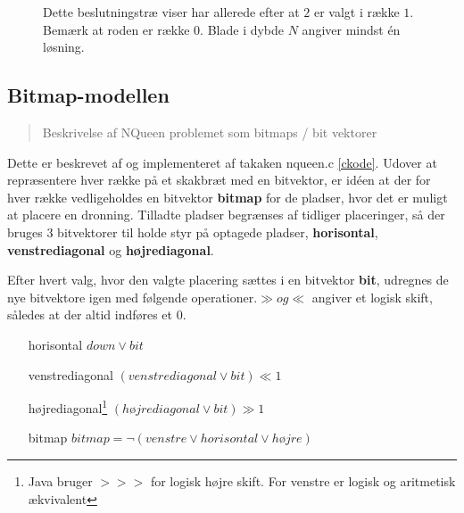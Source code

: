 \documentclass[draft,a4paper,10pt]{article}
\begin{document}
\begin{figure}[!h]


\caption{
Dette beslutningstræ viser har allerede efter at $2$ er valgt i række $1$.
Bemærk at roden er række 0. Blade i dybde $N$ angiver mindst én løsning.}
\label{fig:tree}
\end{figure}


\subsection{Bitmap-modellen}\label{bitmapmodellen}
\begin{verse}
	Beskrivelse af NQueen problemet som bitmaps / bit vektorer
\end{verse}


Dette er beskrevet af \cite{Zongyan02} og implementeret af takaken nqueen.c \ref{ckode}. Udover at repræsentere hver række på et skakbræt med en bitvektor, er idéen at der for hver række vedligeholdes en bitvektor \textbf{bitmap} for de pladser, hvor det er muligt at placere en dronning.  Tilladte pladser begrænses af tidliger placeringer, så der bruges 3 bitvektorer til holde styr på optagede pladser, \textbf{horisontal}, \textbf{venstrediagonal}  og \textbf{højrediagonal}.

Efter hvert valg, hvor den valgte placering sættes i en bitvektor \textbf{bit}, udregnes de nye bitvektore igen med følgende operationer.$\gg og \ll$ angiver et logisk skift, således at der altid indføres et $0$.
\begin{itemize}
	\item[horisontal] $down \lor bit$ 
	\item[venstrediagonal] $(venstrediagonal \lor bit) \ll 1$
	\item[højrediagonal\footnote{Java bruger $>>>$ for logisk højre skift. For venstre er logisk og aritmetisk ækvivalent}] $(højrediagonal \lor bit) \gg 1$
	\item[bitmap]	$bitmap = \lnot(venstre \lor horisontal \lor højre)$	
\end{itemize}
\end{document}
